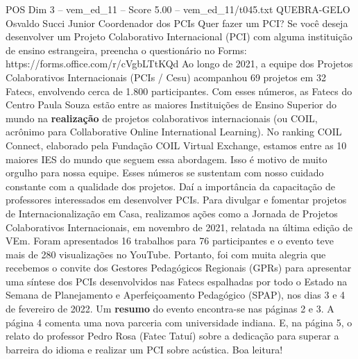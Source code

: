 \begin{textsample}{POS Dim 3 – vem\_ed\_11 – Score 5.00 – vem\_ed\_11/t045.txt}  \label{ex:f3_pos_137}
QUEBRA-GELO Osvaldo Succi Junior Coordenador dos PCIs Quer fazer um PCI?
Se você deseja desenvolver um Projeto Colaborativo Internacional (PCI) com alguma instituição de ensino estrangeira, preencha o questionário no Forms: https://forms.office.com/r/cVgbLTtKQd Ao longo de 2021, a equipe dos Projetos Colaborativos Internacionais (PCIs / Cesu) acompanhou 69 projetos em 32 Fatecs, envolvendo cerca de 1.800 participantes.
Com esses números, as Fatecs do Centro Paula Souza estão entre as maiores Instituições de Ensino Superior do mundo na \textbf{realização} de projetos colaborativos internacionais (ou COIL, acrônimo para Collaborative Online International Learning).
No ranking COIL Connect, elaborado pela Fundação COIL Virtual Exchange, estamos entre as 10 maiores IES do mundo que seguem essa abordagem.
Isso é motivo de muito orgulho para nossa equipe.
Esses números se sustentam com nosso cuidado constante com a qualidade dos projetos.
Daí a importância da capacitação de professores interessados em desenvolver PCIs.
Para divulgar e fomentar projetos de Internacionalização em Casa, realizamos ações como a Jornada de Projetos Colaborativos Internacionais, em novembro de 2021, relatada na última edição de VEm.
Foram apresentados 16 trabalhos para 76 participantes e o evento teve mais de 280 visualizações no YouTube.
Portanto, foi com muita alegria que recebemos o convite dos Gestores Pedagógicos Regionais (GPRs) para apresentar uma síntese dos PCIs desenvolvidos nas Fatecs espalhadas por todo o Estado na Semana de Planejamento e Aperfeiçoamento Pedagógico (SPAP), nos dias 3 e 4 de fevereiro de 2022.
Um \textbf{resumo} do evento encontra-se nas páginas 2 e 3.
A página 4 comenta uma nova parceria com universidade indiana.
E, na página 5, o relato do professor Pedro Rosa (Fatec Tatuí) sobre a dedicação para superar a barreira do idioma e realizar um PCI sobre acústica.
Boa leitura!

\end{textsample}
